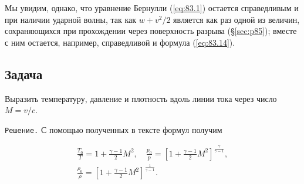 Мы увидим, однако, что уравнение Бернулли (\ref{eq:83.1}) остается справедливым и при наличии ударной волны, так как $w+v^2/2$ является как раз одной из величин, сохраняющихся при прохождении через поверхность разрыва (\S\ref{sec:p85}); вместе с ним остается, например, справедливой и формула (\ref{eq:83.14}).

\subsection*{Задача}
Выразить температуру, давление и плотность вдоль линии тока через число $M=v/c$.

\texttt{Решение.} С помощью полученных в тексте формул получим

\begin{eqnarray}
    \frac{T_0}{T} = 1 + \frac{\gamma-1}{2} M^2, \quad
    \frac{p_0}{p} = \left\lbrack 1 + \frac{\gamma-1}{2} M^2 \right\rbrack^\frac{\gamma}{\gamma - 1}, \nonumber \\
    \frac{\rho_0}{\rho} = \left\lbrack 1 + \frac{\gamma-1}{2} M^2 \right\rbrack^\frac{1}{\gamma - 1}. \nonumber
\end{eqnarray}

\begin{comment}




\end{comment}
